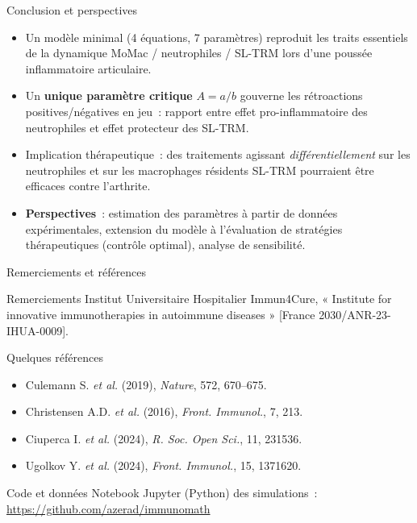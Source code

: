 \documentclass[aspectratio=169,12pt]{beamer}
\begin{document}
\begin{frame}{Conclusion et perspectives}
\begin{itemize}
\item Un modèle \alert{minimal} (4 équations, 7 paramètres) reproduit les traits essentiels de la dynamique MoMac / neutrophiles / SL-TRM lors d'une poussée inflammatoire articulaire.
\item Un \textbf{unique paramètre critique} $A=a/b$ gouverne les rétroactions positives/négatives en jeu~: rapport entre effet pro-inflammatoire des neutrophiles et effet protecteur des SL-TRM.
\item Implication thérapeutique~: des traitements agissant \emph{différentiellement} sur les neutrophiles et sur les macrophages résidents SL-TRM pourraient être efficaces contre l'arthrite.
\item \textbf{Perspectives}~: estimation des paramètres à partir de données expérimentales, extension du modèle à l'évaluation de stratégies thérapeutiques (contrôle optimal), analyse de sensibilité.
\end{itemize}
\end{frame}

\begin{frame}{Remerciements et références}
\vspace{-6pt}
{\footnotesize
\begin{block}{Remerciements}
\footnotesize Institut Universitaire Hospitalier Immun4Cure, « Institute for innovative immunotherapies in autoimmune diseases » [France 2030/ANR-23-IHUA-0009].
\end{block}
\vspace{-4pt}
\begin{block}{Quelques références}
\footnotesize
\begin{itemize}\itemsep0pt
\item Culemann S. \textit{et al.} (2019), \textit{Nature}, 572, 670--675.
\item Christensen A.D. \textit{et al.} (2016), \textit{Front. Immunol.}, 7, 213.
\item Ciuperca I. \textit{et al.} (2024), \textit{R. Soc. Open Sci.}, 11, 231536.
\item Ugolkov Y. \textit{et al.} (2024), \textit{Front. Immunol.}, 15, 1371620.
\end{itemize}
\end{block}
\vspace{-4pt}
\begin{block}{Code et données}
\footnotesize Notebook Jupyter (Python) des simulations~: \url{https://github.com/azerad/immunomath}
\end{block}}
\end{frame}
\end{document}
